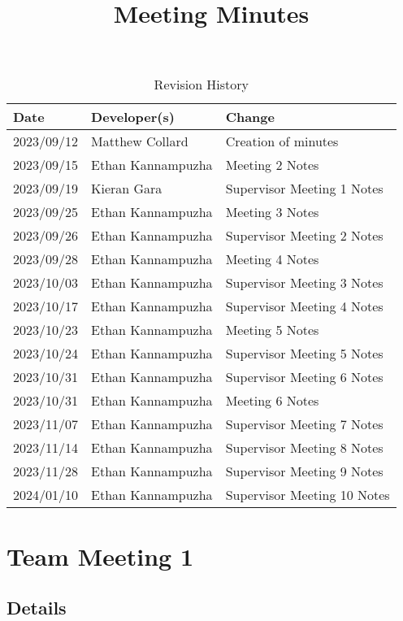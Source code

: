 \documentclass{article}
\title{Meeting Minutes\\\progname}
\author{\authname}
\date{}
\begin{document}
\maketitle

\begin{table}[hp]
\caption{Revision History} \label{TblRevisionHistory}
\begin{tabularx}{\textwidth}{llX}
\toprule
\textbf{Date} & \textbf{Developer(s)} & \textbf{Change}\\
\midrule
2023/09/12 & Matthew Collard & Creation of minutes\\
2023/09/15 & Ethan Kannampuzha & Meeting 2 Notes\\
2023/09/19 & Kieran Gara & Supervisor Meeting 1 Notes\\
2023/09/25 & Ethan Kannampuzha & Meeting 3 Notes\\
2023/09/26 & Ethan Kannampuzha & Supervisor Meeting 2 Notes\\
2023/09/28 & Ethan Kannampuzha & Meeting 4 Notes\\
2023/10/03 & Ethan Kannampuzha & Supervisor Meeting 3 Notes\\
2023/10/17 & Ethan Kannampuzha & Supervisor Meeting 4 Notes\\
2023/10/23 & Ethan Kannampuzha & Meeting 5 Notes\\
2023/10/24 & Ethan Kannampuzha & Supervisor Meeting 5 Notes\\
2023/10/31 & Ethan Kannampuzha & Supervisor Meeting 6 Notes\\
2023/10/31 & Ethan Kannampuzha & Meeting 6 Notes\\
2023/11/07 & Ethan Kannampuzha & Supervisor Meeting 7 Notes\\
2023/11/14 & Ethan Kannampuzha & Supervisor Meeting 8 Notes\\
2023/11/28 & Ethan Kannampuzha & Supervisor Meeting 9 Notes\\
2024/01/10 & Ethan Kannampuzha & Supervisor Meeting 10 Notes\\
\bottomrule
\end{tabularx}
\end{table}

\pagebreak
\section*{Team Meeting 1}
\subsection*{Details}
\end{document}

